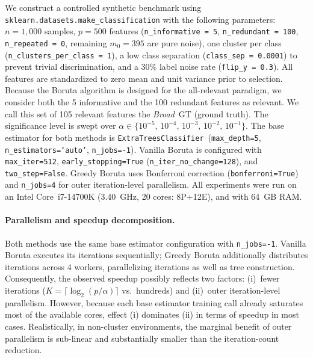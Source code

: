\documentclass[runningheads]{llncs}
\begin{document}
We construct a controlled synthetic benchmark using \texttt{sklearn.datasets.make\_classification} with the following parameters: $n=1{,}000$ samples, $p=500$ features (\texttt{n\_informative = 5}, \texttt{n\_redundant = 100}, \texttt{n\_repeated = 0}, remaining $m_0 = 395$ are pure noise), one cluster per class (\texttt{n\_clusters\_per\_class = 1}), a low class separation (\texttt{class\_sep = 0.0001}) to prevent trivial discrimination, and a 30\% label noise rate (\texttt{flip\_y = 0.3}). All features are standardized to zero mean and unit variance prior to selection. Because the Boruta algorithm is designed for the all-relevant paradigm, we consider both the 5 informative and the 100 redundant features as relevant. We call this set of 105 relevant features the \emph{Broad}~GT (ground truth). The significance level is swept over $\alpha \in \{10^{-5},\,10^{-4},\,10^{-3},\,10^{-2},\,10^{-1}\}$. The base estimator for both methods is \texttt{ExtraTreesClassifier}~\cite{geurts2006extremely,pedregosa2011scikit}(\texttt{max\_depth=5}, \texttt{n\_estimators=`auto'}, \texttt{n\_jobs=-1}). Vanilla Boruta is configured with \texttt{max\_iter=512}, \texttt{early\_stopping=True} (\texttt{n\_iter\_no\_change=128}), and \texttt{two\_step=False}. Greedy Boruta uses Bonferroni correction (\texttt{bonferroni=True}) and \texttt{n\_jobs=4} for outer iteration-level parallelism. All experiments were run on an Intel Core~i7-14700K (3.40~GHz, 20 cores: 8P+12E), and with 64~GB RAM.

\paragraph{Parallelism and speedup decomposition.}
Both methods use the same base estimator configuration with \texttt{n\_jobs=-1}. Vanilla Boruta executes its iterations sequentially; Greedy Boruta additionally distributes iterations across 4 workers, parallelizing iterations as well as tree construction. Consequently, the observed speedup possibly reflects two factors: (i)~fewer iterations ($K = \lceil \log_2(p/\alpha) \rceil$ vs.\ hundreds) and (ii)~outer iteration-level parallelism. However, because each base estimator training call already saturates most of the available cores, effect (i) dominates (ii) in terms of speedup in most cases. Realistically, in non-cluster environments, the marginal benefit of outer parallelism is sub-linear and substantially smaller than the iteration-count reduction.
\end{document}
